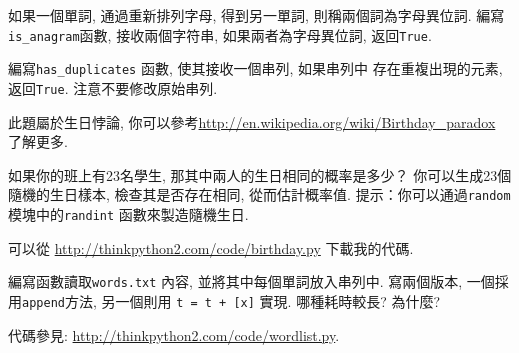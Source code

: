 \documentclass[10pt]{book}
\begin{document}
\begin{exercise}
\label{anagram}

如果一個單詞, 通過重新排列字母, 得到另一單詞, 則稱兩個詞為字母異位詞. 
編寫\verb"is_anagram"函數, 接收兩個字符串, 如果兩者為字母異位詞, 返回{\tt True}.
\end{exercise}



\begin{exercise}
\label{duplicate}

編寫\verb"has_duplicates" 函數, 使其接收一個串列, 如果串列中
存在重複出現的元素, 返回{\tt True}. 注意不要修改原始串列.

\end{exercise}


\begin{exercise}

此題屬於生日悖論, 你可以參考\url{http://en.wikipedia.org/wiki/Birthday_paradox}
了解更多.

如果你的班上有23名學生, 那其中兩人的生日相同的概率是多少？
你可以生成23個隨機的生日樣本, 檢查其是否存在相同, 從而估計概率值. 
提示：你可以通過{\tt random}模塊中的{\tt randint} 函數來製造隨機生日. 

可以從 \url{http://thinkpython2.com/code/birthday.py} 下載我的代碼.

\end{exercise}


\begin{exercise}

編寫函數讀取{\tt words.txt} 內容, 並將其中每個單詞放入串列中. 
寫兩個版本, 一個採用{\tt append}方法, 另一個則用 {\tt t = t + [x]} 實現. 
哪種耗時較長? 為什麼?

代碼參見: \url{http://thinkpython2.com/code/wordlist.py}.

\end{exercise}
\end{document}
